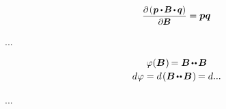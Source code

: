 \nopagebreak\begin{equation*}
\scalebox{0.92}[0.92]{$\displaystyle \frac{\partial \hspace{-0.1ex} \left( \hspace{.1ex} \bm{p} \dotp \hspace{-0.2ex} \bm{B} \hspace{-0.16ex} \dotp \hspace{-0.1ex} \bm{q} \right)}{\partial \hspace{-0.1ex} \bm{B}}$}
= \bm{p} \bm{q}
\end{equation*}

...

\nopagebreak\begin{equation*}\begin{array}{c}
\varphi(\bm{B}\hspace{.1ex}) \hspace{-0.2ex}
= \bm{B} \hspace{-0.2ex} \dotdotp \hspace{-0.2ex} \bm{B}
\\[.2em]
%
d \hspace{.1ex} \varphi
= d \hspace{.2ex} ( \bm{B} \hspace{-0.2ex} \dotdotp \hspace{-0.2ex} \bm{B} \hspace{.1ex} ) \hspace{-0.2ex}
= d ...
\end{array}\end{equation*}


...



